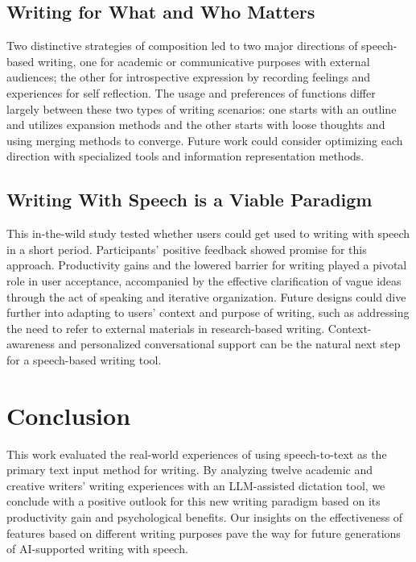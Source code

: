 \subsection{Writing for What and Who Matters}
Two distinctive strategies of composition led to two major directions of speech-based writing, one for academic or communicative purposes with external audiences; the other for introspective expression by recording feelings and experiences for self reflection. The usage and preferences of functions differ largely between these two types of writing scenarios: one starts with an outline and utilizes expansion methods and the other starts with loose thoughts and using merging methods to converge. Future work could consider optimizing each direction with specialized tools and information representation methods. 

\subsection{Writing With Speech is a Viable Paradigm} 
This in-the-wild study tested whether users could get used to writing with speech in a short period. Participants' positive feedback showed promise for this approach. Productivity gains and the lowered barrier for writing played a pivotal role in user acceptance, accompanied by the effective clarification of vague ideas through the act of speaking and iterative organization. Future designs could dive further into adapting to users' context and purpose of writing, such as addressing the need to refer to external materials in research-based writing. Context-awareness and personalized conversational support can be the natural next step for a speech-based writing tool. 

\section{Conclusion}
This work evaluated the real-world experiences of using speech-to-text as the primary text input method for writing. By analyzing twelve academic and creative writers' writing experiences with an LLM-assisted dictation tool, we conclude with a positive outlook for this new writing paradigm based on its productivity gain and psychological benefits. Our insights on the effectiveness of features based on different writing purposes pave the way for future generations of AI-supported writing with speech. 
